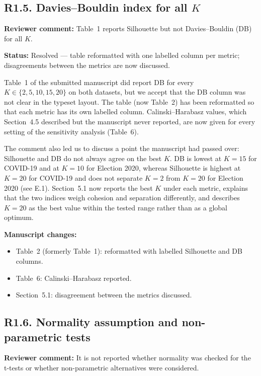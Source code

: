 \documentclass[11pt,a4paper]{article}
\newcommand{\status}[1]{\textbf{\color{statusgreen}Status:} #1}
\newcommand{\parthead}[1]{\par\medskip\textbf{#1}\par}
\begin{document}
\subsection{R1.5. Davies--Bouldin index for all $K$}

\begin{revcomment}
\textbf{Reviewer comment:} Table~1 reports Silhouette but not Davies--Bouldin (DB) for all $K$.
\end{revcomment}

\status{Resolved --- table reformatted with one labelled column per metric; disagreements between the metrics are now discussed.}

Table~1 of the submitted manuscript did report DB for every $K \in \{2, 5, 10, 15, 20\}$ on both datasets, but we accept that the DB column was not clear in the typeset layout. The table (now Table~2) has been reformatted so that each metric has its own labelled column. Calinski--Harabasz values, which Section~4.5 described but the manuscript never reported, are now given for every setting of the sensitivity analysis (Table~6).

The comment also led us to discuss a point the manuscript had passed over: Silhouette and DB do not always agree on the best $K$. DB is lowest at $K = 15$ for COVID-19 and at $K = 10$ for Election 2020, whereas Silhouette is highest at $K = 20$ for COVID-19 and does not separate $K = 2$ from $K = 20$ for Election 2020 (see E.1). Section~5.1 now reports the best $K$ under each metric, explains that the two indices weigh cohesion and separation differently, and describes $K = 20$ as the best value within the tested range rather than as a global optimum.

\parthead{Manuscript changes:}
\begin{itemize}
\item Table~2 (formerly Table~1): reformatted with labelled Silhouette and DB columns.
\item Table~6: Calinski--Harabasz reported.
\item Section~5.1: disagreement between the metrics discussed.
\end{itemize}

\subsection{R1.6. Normality assumption and non-parametric tests}

\begin{revcomment}
\textbf{Reviewer comment:} It is not reported whether normality was checked for the t-tests or whether non-parametric alternatives were considered.
\end{revcomment}
\end{document}
